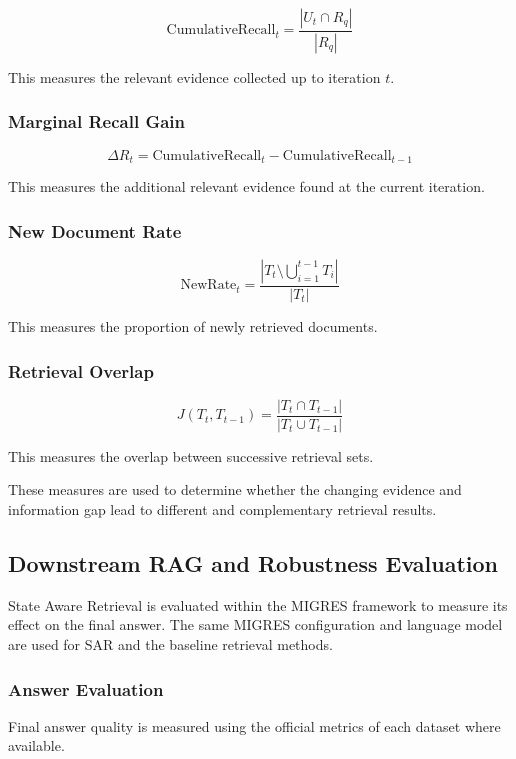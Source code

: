 \documentclass[12pt,a4paper]{report}
\begin{document}
\[
\mathrm{CumulativeRecall}_t
=
\frac{|U_t\cap R_q|}
{|R_q|}
\]

This measures the relevant evidence collected up to iteration $t$.

\subsubsection{Marginal Recall Gain}

\[
\Delta R_t
=
\mathrm{CumulativeRecall}_t
-
\mathrm{CumulativeRecall}_{t-1}
\]

This measures the additional relevant evidence found at the current
iteration.

\subsubsection{New Document Rate}

\[
\mathrm{NewRate}_t
=
\frac{
\left|
T_t
\setminus
\bigcup_{i=1}^{t-1}T_i
\right|
}
{|T_t|}
\]

This measures the proportion of newly retrieved documents.

\subsubsection{Retrieval Overlap}

\[
J(T_t,T_{t-1})
=
\frac{|T_t\cap T_{t-1}|}
{|T_t\cup T_{t-1}|}
\]

This measures the overlap between successive retrieval sets.

These measures are used to determine whether the changing evidence and
information gap lead to different and complementary retrieval results.

\subsection{Downstream RAG and Robustness Evaluation}

State Aware Retrieval is evaluated within the MIGRES framework to
measure its effect on the final answer. The same MIGRES configuration
and language model are used for SAR and the baseline retrieval methods.

\subsubsection{Answer Evaluation}

Final answer quality is measured using the official metrics of each
dataset where available.
\end{document}
